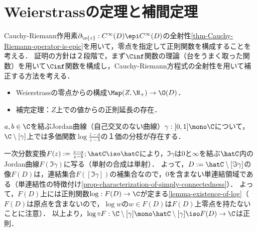 \documentclass[uplatex, dvipdfmx]{jsreport}
\begin{document}
\section{Weierstrassの定理と補間定理}

\begin{tcolorbox}[colframe=ForestGreen, colback=ForestGreen!10!white,breakable,colbacktitle=ForestGreen!40!white,coltitle=black,fonttitle=\bfseries\sffamily,
title=]
    Cauchy-Riemann作用素$\partial_{\o{z}}:C^\infty(D)\epi C^\infty(D)$の全射性\ref{thm-Cauchy-Riemann-operator-is-epic}を用いて，零点を指定して正則関数を構成することを考える．
    証明の方針は２段階で，まず$\Cinf$関数の理論（台をうまく取った関数）を用いて$\Cinf$関数を構成し，Cauchy-Riemann方程式の全射性を用いて補正する方法を考える．
    \begin{itemize}
        \item Weierstrassの零点からの構成$\Map(Z,\N_+)\to\O(D)$．
        \item 補完定理：$Z$上での値からの正則延長の存在．
    \end{itemize}
\end{tcolorbox}

\begin{lemma}\label{lemma-branch-of-log}
    $a,b\in\C$を結ぶJordan曲線（自己交叉のない曲線）$\gamma:[0,1]\mono\C$について，$\C\setminus[\gamma]$上では多価関数$\log\frac{z-a}{z-b}$の１価の分枝が存在する．
\end{lemma}
\begin{Proof}
    一次分数変換$F(z):=\frac{z-a}{z-b};\hatC\iso\hatC$により，$\Im\gamma$は$0$と$\infty$を結ぶ$\hatC$内のJordan曲線$F(\Im\gamma)$に写る（単射の合成は単射）．
    よって，$D:=\hatC\setminus[\Im\gamma]$の像$F(D)$は，連結集合$F([\Im\gamma])$の補集合なので，$0$を含まない単連結領域である（単連結性の特徴付け\ref{prop-characterization-of-simply-connectedness}）．
    よって，$F(D)$上には正則関数$\log:F(D)\to\C$が定まる\ref{lemma-existence-of-log}（$F(D)$は原点を含まないので，$\log w$の$w\in F(D)$は$F(D)$上零点を持たないことに注意）．
    以上より，$\log\circ F:\C\setminus[\gamma]\mono\hatC\setminus[\gamma]\iso F(D)\to\C$は正則．
\end{Proof}
\end{document}
